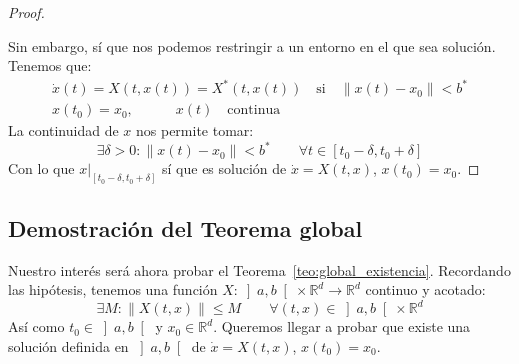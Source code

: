 \begin{prop}
\begin{proof}
\begin{figure}[H]
        \end{figure}


        \noindent
        Sin embargo, sí que nos podemos restringir a un entorno en el que sea solución. Tenemos que:
        \begin{gather*}
            \dot{x}(t) = X(t,x(t)) = X^\ast(t,x(t)) \quad \text{si}\quad \|x(t)-x_0\| < b^\ast \\
            x(t_0) = x_0, \quad \qquad x(t)\quad \text{continua}
        \end{gather*}
        La continuidad de $x$ nos permite tomar:
        \begin{equation*}
            \exists \delta>0 : \|x(t)-x_0\| < b^\ast \qquad \forall t\in [t_0-\delta,t_0+\delta]
        \end{equation*}
        Con lo que $x\big|_{[t_0-\delta,t_0+\delta]}$ sí que es solución de $\dot{x} = X(t,x)$, $x(t_0) = x_0$.
    \end{proof}
\end{prop}

\subsection{Demostración del Teorema global}
\noindent
Nuestro interés será ahora probar el Teorema~\ref{teo:global_existencia}. Recordando las hipótesis, tenemos una función $X:\left]a,b\right[\times \mathbb{R}^d\to \mathbb{R}^d$ continuo y acotado:
\begin{equation*}
    \exists M:\|X(t,x)\|\leq M \qquad \forall (t,x)\in \left]a,b\right[\times \mathbb{R}^d
\end{equation*}
Así como $t_0\in \left]a,b\right[$ y $x_0\in \mathbb{R}^d$. Queremos llegar a probar que existe una solución definida en $\left]a,b\right[$ de $\dot{x} = X(t,x)$, $x(t_0) = x_0$.\\

